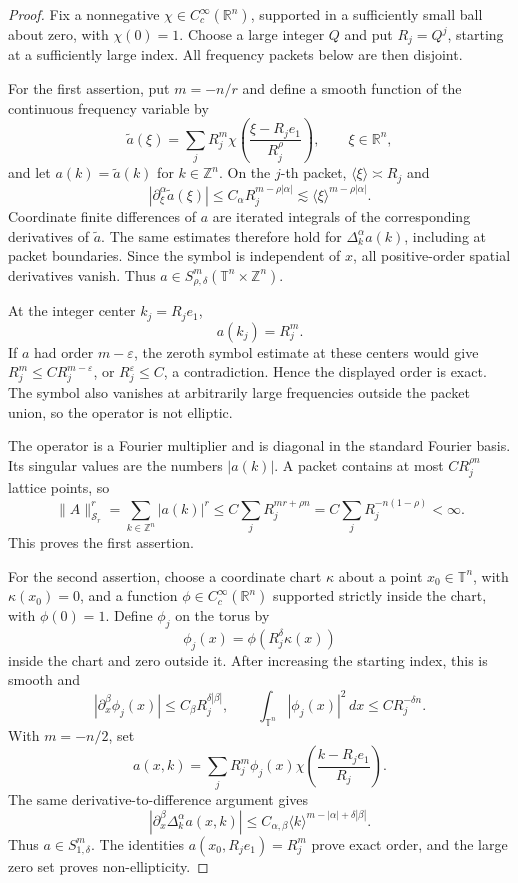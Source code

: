 \documentclass[11pt]{article}
\theoremstyle{remark}
\newcommand{\T}{\mathbb T}
\newcommand{\Z}{\mathbb Z}
\newcommand{\R}{\mathbb R}
\newcommand{\Schatten}{\mathscr S}
\begin{document}
\begin{proof}
Fix a nonnegative \(\chi\in C_c^\infty(\R^n)\), supported in a sufficiently
small ball about zero, with \(\chi(0)=1\). Choose a large integer \(Q\) and
put \(R_j=Q^j\), starting at a sufficiently large index. All frequency
packets below are then disjoint.

For the first assertion, put \(m=-n/r\) and define a smooth function of the
continuous frequency variable by
\[
 \widetilde a(\xi)=
 \sum_{j} R_j^m
 \chi\!\left(\frac{\xi-R_je_1}{R_j^\rho}\right),
 \qquad \xi\in\R^n,
\]
and let \(a(k)=\widetilde a(k)\) for \(k\in\Z^n\). On the \(j\)-th packet,
\(\langle\xi\rangle\asymp R_j\) and
\[
 |\partial_\xi^\alpha\widetilde a(\xi)|
 \le C_\alpha R_j^{m-\rho|\alpha|}
 \lesssim \langle\xi\rangle^{m-\rho|\alpha|}.
\]
Coordinate finite differences of \(a\) are iterated integrals of the
corresponding derivatives of \(\widetilde a\). The same estimates therefore
hold for \(\Delta_k^\alpha a(k)\), including at packet boundaries. Since the
symbol is independent of \(x\), all positive-order spatial derivatives
vanish. Thus \(a\in S^m_{\rho,\delta}(\T^n\times\Z^n)\).

At the integer center \(k_j=R_je_1\),
\[
 a(k_j)=R_j^m.
\]
If \(a\) had order \(m-\varepsilon\), the zeroth symbol estimate at these
centers would give \(R_j^m\le C R_j^{m-\varepsilon}\), or
\(R_j^\varepsilon\le C\), a contradiction. Hence the displayed order is
exact. The symbol also vanishes at arbitrarily large frequencies outside the
packet union, so the operator is not elliptic.

The operator is a Fourier multiplier and is diagonal in the standard Fourier
basis. Its singular values are the numbers \(|a(k)|\). A packet contains at
most \(C R_j^{\rho n}\) lattice points, so
\[
 \|A\|_{\Schatten_r}^r
 =\sum_{k\in\Z^n}|a(k)|^r
 \le C\sum_j R_j^{mr+\rho n}
 =C\sum_jR_j^{-n(1-\rho)}<\infty.
\]
This proves the first assertion.

For the second assertion, choose a coordinate chart \(\kappa\) about a point
\(x_0\in\T^n\), with \(\kappa(x_0)=0\), and a function
\(\phi\in C_c^\infty(\R^n)\) supported strictly inside the chart, with
\(\phi(0)=1\). Define \(\phi_j\) on the torus by
\[
 \phi_j(x)=\phi(R_j^\delta\kappa(x))
\]
inside the chart and zero outside it. After increasing the starting index,
this is smooth and
\[
 |\partial_x^\beta\phi_j(x)|\le C_\beta R_j^{\delta|\beta|},
 \qquad
 \int_{\T^n}|\phi_j(x)|^2\,dx\le C R_j^{-\delta n}.
\]
With \(m=-n/2\), set
\[
 a(x,k)=\sum_j R_j^m\phi_j(x)
 \chi\!\left(\frac{k-R_je_1}{R_j}\right).
\]
The same derivative-to-difference argument gives
\[
 |\partial_x^\beta\Delta_k^\alpha a(x,k)|
 \le C_{\alpha,\beta}
 \langle k\rangle^{m-|\alpha|+\delta|\beta|}.
\]
Thus \(a\in S^m_{1,\delta}\). The identities
\(a(x_0,R_je_1)=R_j^m\) prove exact order, and the large zero set proves
non-ellipticity.


\end{proof}
\end{document}
